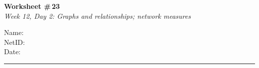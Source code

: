 \documentclass[11pt]{article}
\begin{document}
\noindent
\begin{minipage}[t]{0.55\textwidth}
  \vspace{0pt}
  {\LARGE \textbf{Worksheet \#\,23}} \\[0.3em]
  {\large \textit{Week 12, Day 2: Graphs and relationships; network measures}}
\end{minipage}
\hfill
\begin{minipage}[t]{0.40\textwidth}
  \vspace{0pt}
  \begin{mdframed}[linecolor=black, linewidth=1pt, innertopmargin=10pt, innerbottommargin=10pt]
    \small
    \vspace{0.4cm}
    Name: \underline{\hspace{4.5cm}} \\[1em]
    NetID: \underline{\hspace{4.3cm}} \\[1em]
    Date: \underline{\hspace{4.4cm}} \\
  \end{mdframed}
\end{minipage}

\vspace{1em}
\noindent\rule{\linewidth}{1pt}
\vspace{0.2em}
\end{document}
